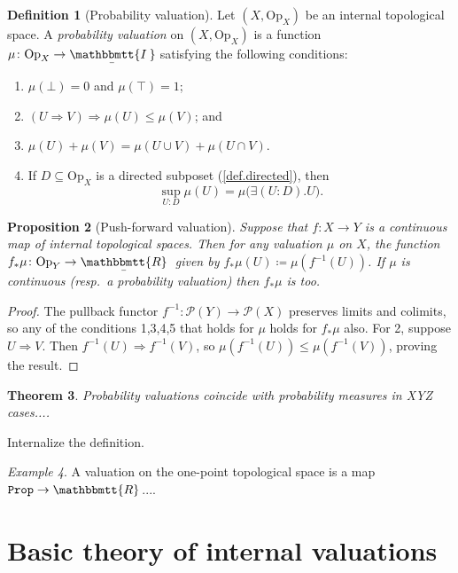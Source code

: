\documentclass[11pt, oneside, article]{memoir}
\theoremstyle{plain}
\newtheorem{theorem}{Theorem}[chapter] %
\newtheorem{proposition}[theorem]{Proposition}
\theoremstyle{definition}
\newtheorem{definition}[theorem]{Definition}
\theoremstyle{remark}
\newtheorem{example}[theorem]{Example}
\renewcommand{\ss}{\subseteq}
\newcommand{\const}[1]{\mathtt{#1}}
\newcommand{\Set}[1]{\mathrm{#1}}
\newcommand{\ubar}[1]{\underaccent{\bar}{#1}}
\newcommand{\internal}[1]{\raisebox{-.03ex}{$\mathbbmtt{#1}$}}
\newcommand{\hs}{\hspace{1.1pt}}
\newcommand{\trr}{\internal{R}\hs}
\newcommand{\tii}{\ubar{\internal{I\hs\hs}}\!\hs}
\newcommand{\tlrr}{\ubar{\trr}\hs}
\newcommand{\pow}{\mathcal{P}}
\newcommand{\prop}{\const{Prop}}
\newcommand{\Op}{\Set{Op}}
\newcommand{\inv}{^{-1}}
\newcommand{\imp}{\Rightarrow}
\begin{document}
\begin{definition}[Probability valuation]
Let $(X,\Op_X)$ be an internal topological space. A \emph{probability valuation} on $(X,\Op_X)$ is a function $\mu\colon\Op_X\to\tii$ satisfying the following conditions:
\begin{enumerate}
	\item $\mu(\bot)=0$ and $\mu(\top)=1$;
	\item $(U\imp V)\imp\mu(U)\leq\mu(V)$; and
	\item $\mu(U)+\mu(V)=\mu(U\cup V)+\mu(U\cap V)$.
	\item If $D\ss\Op_X$ is a directed subposet (\cref{def.directed}), then
	\begin{equation}\label{eqn.scott_continuity}
	\sup_{U: D}\mu(U)=\mu\big(\exists(U:D).U\big).
	\end{equation}
\end{enumerate}
\end{definition}


\begin{proposition}[Push-forward valuation]\label{prop.pushforward}
Suppose that $f\colon X\to Y$ is a continuous map of internal topological spaces. Then for any valuation $\mu$ on $X$, the function $f_*\mu\colon\Op_Y\to\tlrr$ given by $f_*\mu(U)\coloneqq\mu(f\inv(U))$. If $\mu$ is continuous (resp.\ a probability valuation) then $f_*\mu$ is too.
\end{proposition}
\begin{proof}
The pullback functor $f\inv\colon\pow(Y)\to\pow(X)$ preserves limits and colimits, so any of the conditions 1,3,4,5 that holds for $\mu$ holds for $f_*\mu$ also. For 2, suppose $U\imp V$. Then $f\inv(U)\imp f\inv(V)$, so $\mu(f\inv(U))\leq\mu(f\inv(V))$, proving the result.
\end{proof}

\begin{theorem}
Probability valuations coincide with probability measures in XYZ cases....
\end{theorem}

Internalize the definition.

\begin{example}
A valuation on the one-point topological space is a map $\prop\to\trr$....
\end{example}

\chapter{Basic theory of internal valuations}
\end{document}
